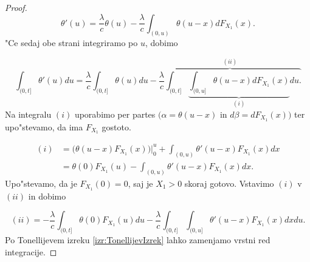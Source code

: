 \documentclass[12pt, a4paper, reqno]{amsart}
\theoremstyle{definition}
\theoremstyle{plain}
\newcommand{\1}{\mathds{1}}
\newcommand*{\refPriloga}[1]{%
  \begingroup
    \hypersetup{
      linkcolor=properpurple,
      linkbordercolor=properpurple,
    }%
    \ref{#1}%
  \endgroup
}
\begin{document}
\begin{proof}
        \begin{equation*}
            \theta'(u) = \frac{\lambda}{c}\theta(u) - \frac{\lambda}{c}\int_{(0, u)}\theta(u - x)dF_{X_1}(x).
        \end{equation*}
        "Ce sedaj obe strani integriramo po $u$, dobimo
        
        \begin{equation}
            \int_{(0, t]}\theta'(u)du = \frac{\lambda}{c}\int_{(0, t]}\theta(u)du - \overbrace{\frac{\lambda}{c}\int_{(0, t]}\underbrace{\int_{(0, u]}\theta(u - x)dF_{X_1}(x)}_{(i)}du.}^{(ii)} 
            \label{eq:verjetnostPrezivetjaIntegral}
        \end{equation}
        Na integralu $(i)$ uporabimo per partes $\bigl(\alpha = \theta(u-x)$ in $d\beta = dF_{X_1}(x)\bigr)$ 
        ter upo"stevamo, da ima $F_{X_1}$ gostoto.

        \begin{align*}
            (i)     &= \bigl(\theta(u - x)F_{X_1}(x)\bigr)\Big|_{0}^{u} + \int_{(0, u)}\theta'(u - x)F_{X_1}(x)dx \\
                    &= \theta(0)F_{X_1}(u) - \int_{(0, u)}\theta'(u - x)F_{X_1}(x)dx.
        \end{align*}
        Upo"stevamo, da je $F_{X_1}(0) = 0$, saj je $X_1 > 0$ skoraj gotovo. Vstavimo $(i)$ 
        v $(ii)$ in dobimo

        \begin{equation*}
            (ii) =  - \frac{\lambda}{c}\int_{(0, t]}\theta(0)F_{X_1}(u)du - \frac{\lambda}{c}\int_{(0, t]}\int_{(0, u]}\theta'(u - x)F_{X_1}(x)dxdu. 
        \end{equation*}
        Po Tonellijevem izreku \refPriloga{izr:TonellijevIzrek} lahko zamenjamo vrstni red integracije.


\end{proof}
\end{document}
